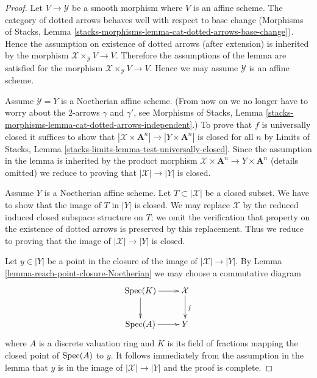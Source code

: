\begin{proof}
Let $V \to \mathcal{Y}$ be a smooth morphism where $V$ is an affine scheme.
The category of dotted arrows behaves well with respect to base change
(Morphisms of Stacks, Lemma
\ref{stacks-morphisms-lemma-cat-dotted-arrows-base-change}).
Hence the assumption on existence of dotted arrows (after extension)
is inherited by the morphism $\mathcal{X} \times_\mathcal{Y} V \to V$.
Therefore the assumptions of the lemma are satisfied for the morphism
$\mathcal{X} \times_\mathcal{Y} V \to V$.
Hence we may assume $\mathcal{Y}$ is an affine scheme.

\medskip\noindent
Assume $\mathcal{Y} = Y$ is a Noetherian affine scheme.
(From now on we no longer have to worry about the
$2$-arrows $\gamma$ and $\gamma'$, see Morphisms of Stacks, Lemma
\ref{stacks-morphisms-lemma-cat-dotted-arrows-independent}.)
To prove that $f$ is universally closed it suffices to show that
$|\mathcal{X} \times \mathbf{A}^n| \to |Y \times \mathbf{A}^n|$ is closed
for all $n$ by Limits of Stacks, Lemma
\ref{stacks-limits-lemma-test-universally-closed}. Since the assumption
in the lemma is inherited by the product morphism
$\mathcal{X} \times \mathbf{A}^n \to Y \times \mathbf{A}^n$ (details omitted)
we reduce to proving that $|\mathcal{X}| \to |Y|$ is closed.

\medskip\noindent
Assume $Y$ is a Noetherian affine scheme.
Let $T \subset |\mathcal{X}|$ be a closed subset. We have to show that
the image of $T$ in $|Y|$ is closed. We may replace $\mathcal{X}$
by the reduced induced closed subspace structure on $T$; we
omit the verification that property on the existence of
dotted arrows is preserved by this replacement.
Thus we reduce to proving that the image
of $|\mathcal{X}| \to |Y|$ is closed.

\medskip\noindent
Let $y \in |Y|$ be a point in the closure of the image of
$|\mathcal{X}| \to |Y|$. By Lemma \ref{lemma-reach-point-closure-Noetherian}
we may choose a commutative diagram
$$
\xymatrix{
\Spec(K) \ar[r] \ar[d] & \mathcal{X} \ar[d]^f \\
\Spec(A) \ar[r] & Y
}
$$
where $A$ is a discrete valuation ring and $K$ is its field of fractions
mapping the closed point of $\mathop{\mathrm{Spec}}(A)$ to $y$. It follows immediately
from the assumption in the lemma that $y$ is in the image of
$|\mathcal{X}| \to |Y|$ and the proof is complete.
\end{proof}










